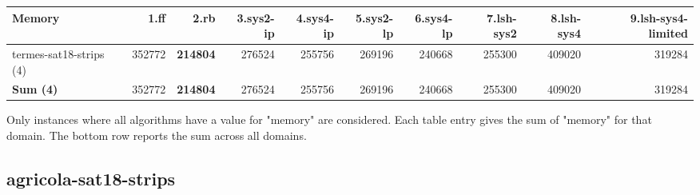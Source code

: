 \documentclass{article}
\newcommand{\numtasks}[1]{\small{(#1)}}
\begin{document}
\begin{tabular}{@{}lrrrrrrrrr@{}}
Memory & 1.ff & 2.rb & 3.sys2-ip & 4.sys4-ip & 5.sys2-lp & 6.sys4-lp & 7.lsh-sys2 & 8.lsh-sys4 & 9.lsh-sys4-limited \\
\midrule
termes-sat18-strips \numtasks{4} & 352772 & \textbf{214804} & 276524 & 255756 & 269196 & 240668 & 255300 & 409020 & 319284 \\
\textbf{Sum \numtasks{4}} & 352772 & \textbf{214804} & 276524 & 255756 & 269196 & 240668 & 255300 & 409020 & 319284 \\
\end{tabular}

Only instances where all algorithms have a value for "memory" are considered. Each table entry gives the sum of "memory" for that domain. The bottom row reports the sum across all domains.

\hypertarget{memory-agricola-sat18-strips}{}
\subsection*{agricola-sat18-strips}
\end{document}
